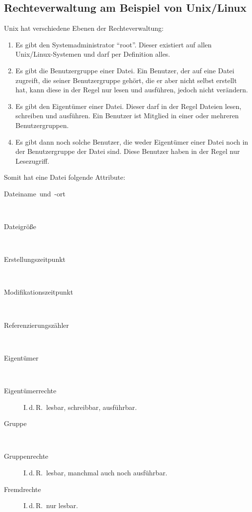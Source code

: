 \subsection[Rechteverwaltung]{Rechteverwaltung am Beispiel von Unix/Linux}

Unix hat verschiedene Ebenen der Rechteverwaltung:
\begin{enumerate}
  \item Es gibt den Systemadministrator \enquote{root}.
    Dieser existiert auf allen Unix\slash Linux-Systemen und darf per Definition alles.
  \item Es gibt die Benutzergruppe einer Datei.
    Ein Benutzer, der auf eine Datei zugreift, die seiner Benutzergruppe gehört, die er aber nicht selbst erstellt hat, kann diese in der Regel nur lesen und ausführen, jedoch nicht verändern.
  \item Es gibt den Eigentümer einer Datei.
    Dieser darf in der Regel Dateien lesen, schreiben und ausführen.
	Ein Benutzer ist Mitglied in einer oder mehreren Benutzergruppen.
  \item Es gibt dann noch solche Benutzer, die weder Eigentümer einer Datei noch in der Benutzergruppe der Datei sind.
	Diese Benutzer haben in der Regel nur Lesezugriff.
\end{enumerate}
Somit hat eine Datei folgende Attribute:
\begin{description}
  \item [{Dateiname~und~-ort}]~
  \item [{Dateigröße}]~
  \item [{Erstellungszeitpunkt}]~
  \item [{Modifikationszeitpunkt}]~
  \item [{Referenzierungszähler}]~
  \item [{Eigentümer}]~
  \item [{Eigentümerrechte}] I.\,d.\,R.~lesbar, schreibbar, ausführbar.
  \item [{Gruppe}]~
  \item [{Gruppenrechte}] I.\,d.\,R.~lesbar, manchmal auch noch ausführbar.
  \item [{Fremdrechte}] I.\,d.\,R.~nur lesbar.
\end{description}

\newpage{}


